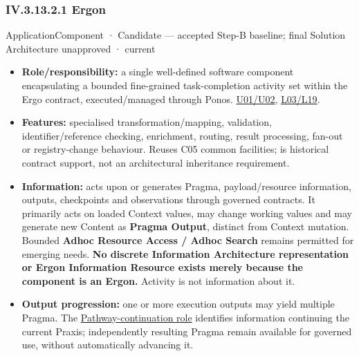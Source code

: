 \subsubsection*{IV.3.13.2.1 Ergon}
\label{navigation:IV.3.13.2.1}

\label{element:49c9eb2bef0c47b8b5328621d5fc5479}
{\small ApplicationComponent · Candidate — accepted Step-B baseline; final Solution Architecture unapproved · current}\par

\begin{itemize}


\item \textbf{Role/responsibility:} a single well-defined software component encapsulating
  a bounded fine-grained task-completion activity set within the Ergo contract,
  executed/managed through Ponos. \href{\detokenize{../../../../../../../../../docs/markdown/05-information-systems-architecture/sources.md#u02}}{U01/U02}, \href{\detokenize{../../../../../../../../../docs/markdown/05-information-systems-architecture/sources.md#l03}}{L03/L19}.

\item \textbf{Features:} specialised transformation/mapping, validation, identifier/reference
  checking, enrichment, routing, result processing, fan-out or registry-change
  behaviour. Reuses C05 common facilities; \texttt{} is historical contract
  support, not an architectural inheritance requirement.

\item \textbf{Information:} acts upon or generates Pragma, payload/resource information,
  outputs, checkpoints and observations through governed contracts. It primarily
  acts on loaded Context values, may change working values and may generate new
  Content as \textbf{Pragma Output}, distinct from Context mutation. Bounded \textbf{Adhoc
  Resource Access / Adhoc Search} remains permitted for emerging needs. \textbf{No discrete
  Information Architecture representation or Ergon Information Resource exists
  merely because the component is an Ergon.} Activity is not information about it.

\item \textbf{Output progression:} one or more execution outputs may yield multiple Pragma.
  The \hyperref[element:27ad143e7c784e378556af8a57c438f7]{Pathway-continuation role}
  identifies information continuing the current Praxis; independently resulting
  Pragma remain available for governed use, without automatically advancing it.


\end{itemize}
